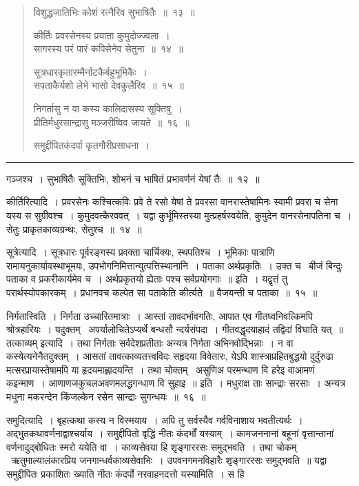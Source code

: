 \documentclass[11pt, openany]{book}
\begin{document}
\newpage

\begin{quote}
{\ha विशुद्धजातिभिः कोशं रत्नैरिव सुभाषितैः~॥~१३~॥

कीर्तिः प्रवरसेनस्य प्रयाता कुमुदोज्ज्वला~।\\
सागरस्य परं पारं कपिसेनेव सेतुना~॥~१४~॥

सूत्रधारकृतारम्मैर्नाटकैर्बहुभूमिकैः~।\\
सपताकैर्यशो लेभे भासो देवकुलैरिव~॥~१५~॥

निगर्तासु न वा कस्य कालिदासस्य सूक्तिषु~।\\
प्रीतिर्मधुरसान्द्रासु मञ्जरीष्विव जायते~॥~१६~॥

समुद्दीपितकंदर्पा कृतगौरीप्रसाधना~।}
\end{quote}

\hrule

\noindent
{\s गञ्जश्च~। सुभाषितैः सूक्तिभिः, शोभनं च भाषितं प्रभावर्णनं येषां तैः~॥~१२~॥

{\qtt कीर्तिरित्यादि}~। प्रवरसेनः कश्चित्कविः प्रवे ते रसो येषां ते प्रवरसा वानरास्तेषामिनः स्वामी प्रवरा च सेना यस्य स सुग्रीवश्च~। कुमुदवत्कैरववत्~। यद्वा कुर्भूमिस्तस्या मुत्प्रहर्षस्वयेति, कुमुदेन वानरसेनापतिना च~। सेतुः प्राकृतकाव्यग्रन्थः, सेतुश्च~॥~१४~॥

{\qtt सूत्रेत्यादि}~। सूत्रधारः पूर्वरङ्गस्य प्रवक्ता चार्चिक्यः, स्थपतिश्च~। भूमिकाः पात्राणि रामायनुकार्यावस्थाभूमयः, उपभोगनिमित्तान्युत्पत्तिस्थानानि~। पताका अर्थप्रकृतिः~। उक्त च \textendash\ {\qt बीजं बिन्दुः पताका व प्रकरीकार्यमेव च~। अर्थप्रकृतयो ह्येताः पश्च सर्वप्रयोगगाः~॥} इति~। यद्वृत्तं तु परार्थस्योपकारकम्~। प्रधानवच कल्पेत सा पताकेति कीर्त्यते~॥ वैजयन्ती च पताका~॥~१५~॥

{\qtt निर्गतास्विति}~। निर्गता उच्चारितमात्राः~। आस्तां तावदर्भावगतिः, आपात एव गीतघ्वनिवत्किमपि श्रोत्रहारियः~। यदुक्तम् \textendash\ {\qt अपर्यालोचितेऽप्यर्थे बन्धसौ न्दर्यसंपदा~। गीतवद्धृदयाहादं तद्विदां विघाति यत्~॥ तत्काव्यम्} इत्यादि~। तथा निर्गताः सर्वदेशप्रतीताः अन्यत्र निर्गता अभिनवोद्भिन्नाः~। न वा कस्येत्यनेनैतदुक्तम्~। आसतां तावत्काव्यतत्त्वविदः सहृदया विवेतारः, येऽपि शास्त्राप्रहितबुद्धयो दुर्दुरुढा मत्सरप्रायास्तेषामपि या हृदयमाह्लादयन्ति~। तथा चोक्तम् \textendash\ {\qt असुणिअ परमन्थाण वि हरेइ वाआमणं कइन्माण~। आणाणजकुचलअवणमलद्धगन्धाण वि सुहाइ~॥} इति~। मधुराक्ष ताः सान्द्राः सरसाः~। अन्यत्र मधुना मकरन्देन किंजल्केन रसेन सान्द्राः सुगन्धयः~॥~१६~॥

{\qtt समुदित्यादि}~। बृहत्कथा कस्य न विस्मयाय~। अपि तु सर्वस्यैव गर्वविनाशाय भवतीत्यर्थः~। अद्भुतकथावर्णनाद्वाश्चर्याय~। समुद्दीपितो वृद्धिं नीतः कंदर्भों यस्याम्~। कामजननानां बहूनां वृत्तान्तानां वर्णनादुद्बोधितः स्मरो ययेति वा~। काव्यसेवया हि शृङ्गाररसः समुद्भवति~। तथा चोकम् \textendash\ {\qt ऋतुमाल्यालंकारप्रिय जनगान्धर्वकाव्यसेवाभिः~। उपवनगमनविहारैः शृङ्गाररसः समुद्भवति~॥} यद्वा समुद्दीपितः प्रकाशितः ख्याति नीतः कंदर्पो नरवाहनदत्तो यस्यामिति~। स हि}
\end{document}
